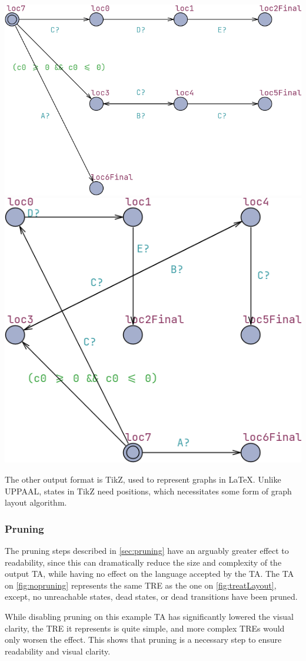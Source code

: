 \begin{center}
    \includegraphics[width=0.8\columnwidth]{Documents/Diagrams/ReadabilityFigures/treat.png}
    \includegraphics[width=0.6\columnwidth]{Documents/Diagrams/ReadabilityFigures/uppaal.png}
\end{center}
\vspace{1em}

The other output format is TikZ, used to represent graphs in LaTeX. Unlike UPPAAL, states in TikZ need positions, which necessitates some form of graph layout algorithm.

\subsubsection{Pruning}

The pruning steps described in \cref{sec:pruning} have an arguably greater effect to readability, since this can dramatically reduce the size and complexity of the output TA, while having no effect on the language accepted by the TA.
The TA on \cref{fig:nopruning} represents the same TRE as the one on \cref{fig:treatLayout}, except, no unreachable states, dead states, or dead transitions have been pruned.

\begin{center}
    
\end{center}

While disabling pruning on this example TA has significantly lowered the visual clarity, the TRE it represents is quite simple, and more complex TREs would only worsen the effect. This shows that pruning is a necessary step to ensure readability and visual clarity.